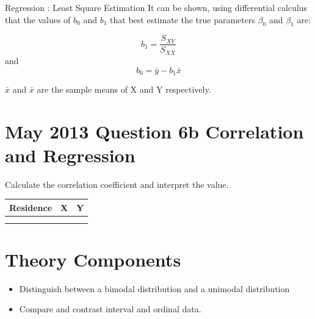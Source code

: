 \documentclass[]{report}
\begin{document}
{Regression : Least Square Estimation}
It can be shown, using differential calculus that the values of $b_0$
and $b_1$ that best estimate the true parameters $\beta_0$ and $\beta_1$ are:

\[ b_1 = \frac{S_{XY}}{S_{XX}}\]
and
\[ b_0 = \bar{y} - b_1 \bar{x} \]

$\bar{x}$ and $\bar{x}$ are the sample means of X and Y respectively.


			\section*{May 2013 Question 6b Correlation and Regression }
			Calculate the correlation coefficient and interpret the value.
			\begin{tabular}{|c|c|c|}
				\hline Residence	& X	  & Y \\ 
				\hline  &  &  \\ 
				\hline  &  &  \\ 
				\hline 
			\end{tabular} 
			
			
			\section*{Theory Components}
			\begin{itemize}
				\item Distinguish between a bimodal distribution and a unimodal distribution
				\item Compare and contrast interval and ordinal data.
			\end{itemize}
\end{document}
